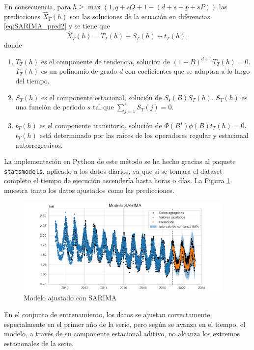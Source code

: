 \documentclass[12pt,twoside]{article}
\begin{document}
En consecuencia, para $h\geq \max(1, q + sQ + 1 - (d+s+p+sP))$ las predicciones $\hat{X}_T(h)$ son las soluciones de la ecuación en diferencias \eqref{eq:SARIMA_pred2} y se tiene que
\begin{equation}\label{eq:SARIMA_pred3}
    \hat{X}_T(h) = T_T(h) + S_T(h) + t_T(h),
\end{equation}
donde
\begin{enumerate}
    \item $T_T(h)$ es el componente de tendencia, solución de $(1-B)^{d+1}T_T(h)=0$. $T_T(h)$ es un polinomio de grado $d$ con coeficientes que se adaptan a lo largo del tiempo.
    \item $S_T(h)$ es el componente estacional, solución de $S_s(B)S_T(h)$. $S_T(h)$ es una función de periodo $s$ tal que $\sum_{j=1}^s S_T(j)=0$.
    \item $t_T(h)$ es el componente transitorio, solución de $\Phi(B^s)\phi(B)t_T(h)=0$. $t_T(h)$ está determinado por las raíces de los operadores regular y estacional autorregresivos.
\end{enumerate}





La implementación en Python de este método se ha hecho gracias al paquete \texttt{statsmodels}, aplicado a los datos diarios, ya que si se tomara el dataset completo el tiempo de ejecución ascendería hasta horas o días. La Figura \ref{fig:SARIMA} muestra tanto los datos ajustados como las predicciones. 

\begin{center}
\begin{figure}[h]
    \includegraphics[width = 0.95\textwidth]{imagenes/SARIMA.png}
    \caption{Modelo ajustado con SARIMA}\label{fig:SARIMA}
\end{figure}
\end{center}

En el conjunto de entrenamiento, los datos se ajustan correctamente, especialmente en el primer año de la serie, pero según se avanza en el tiempo, el modelo, a través de su componente estacional aditivo, no alcanza los extremos estacionales de la serie.
\end{document}
